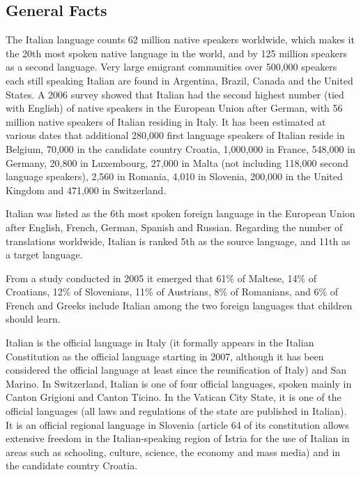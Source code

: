 \documentclass[]{../../metanetpaper}
\begin{document}
\clearpage




\begin{multicols}{2}

\subsection{General Facts}

The Italian language counts 62 million native speakers worldwide, which makes
it the 20th most spoken native language in the world, and by 125 million
speakers as a second language. Very large emigrant communities over 500,000
speakers each still speaking Italian are found in Argentina, Brazil, Canada
and the United States. A 2006 survey showed that Italian had the second
highest number (tied with English) of native speakers in the European Union
after German, with 56 million native speakers of Italian residing in Italy. It
has been estimated at various dates that additional 280,000 first language
speakers of Italian reside in Belgium, 70,000 in the candidate country
Croatia, 1,000,000 in France, 548,000 in Germany, 20,800 in Luxembourg, 27,000
in Malta (not including 118,000 second language speakers), 2,560 in Romania,
4,010 in Slovenia, 200,000 in the United Kingdom and 471,000 in Switzerland.



Italian was listed as the 6th most spoken foreign language in the European
Union after English, French, German, Spanish and Russian. Regarding the number
of translations worldwide, Italian is ranked 5th as the source language, and
11th as a target language.


From a study conducted in 2005 it emerged that 61\% of Maltese, 14\% of
Croatians, 12\% of Slovenians, 11\% of Austrians, 8\% of Romanians, and 6\% of
French and Greeks include Italian among the two foreign languages that
children should learn.

Italian is the official language in Italy (it formally appears in the Italian
Constitution as the official language starting in 2007, although it has been
considered the official language at least since the reunification of Italy)
and San Marino. In Switzerland, Italian is one of four official languages,
spoken mainly in Canton Grigioni and Canton Ticino. In the Vatican City State,
it is one of the official languages (all laws and regulations of the state are
published in Italian). It is an official regional language in Slovenia
(article 64 of its constitution allows extensive freedom in the
Italian-speaking region of Istria for the use of Italian in areas such as
schooling, culture, science, the economy and mass media) and in the candidate
country Croatia.


\end{multicols}
\end{document}
